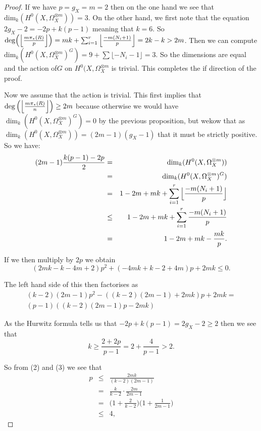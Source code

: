 \documentclass[11pt]{article} %
\begin{document}
\begin{proof}
If we have $p=g_X=m=2$ then on the one hand we see that $\mbox{dim}_k(H^0(X,\Omega_X^{\otimes m}))=3$. On the other hand, we first note that the equation $2g_X-2=-2p+k(p-1)$ meaning that $k=6$. So $\mbox{deg}\Big(\Big{\lfloor}{\frac{m\pi_*(R)}{p}}\Big{\rfloor}\Big)=mk+\sum_{i=1}^r\Big{\lfloor}{\frac{-m(N_i+1)}{p}}\Big{\rfloor}=2k-k>2m$. Then we can compute $\mbox{dim}_k(H^0(X,\Omega_X^{\otimes m})^G)=9+\sum\lfloor-N_i-1\rfloor=3$. So the dimensions are equal and the action of$G$ on $H^0(X,\Omega_X^{\otimes m}$ is trivial. This completes the if direction of the proof.

Now we assume that the action is trivial. This first implies that $\deg\Big(\Big{\lfloor}\frac{m\pi_*(R)}{n}\Big{\rfloor}\Big)\geq 2m$ because otherwise we would have $\dim_k(H^0(X,\Omega_X^{\otimes m})^G)=0$ by the previous proposition, but wekow that as $\dim_k(H^0(X,\Omega_X^{\otimes m}))=(2m-1)(g_X-1)$ that it must be strictly positive. So we have:
	\begin{eqnarray}
		(2m-1)\frac{k(p-1)-2p}{2} & = & \dim_k(H^0(X,\Omega_X^{\otimes m})) \nonumber\\
		& = & \dim_k(H^0(X,\Omega_X^{\otimes m})^G) \nonumber\\
		& = & 1-2m+mk+\sum_{i=1}^r\Big{\lfloor}\frac{-m(N_i+1)}{p}\Big{\rfloor}\nonumber \\
		& \leq & 1-2m+mk+\sum_{i=1}^r\frac{-m(N_i+1)}{p}\nonumber \\
		& = & 1-2m+mk-\frac{mk}{p}.
	\end{eqnarray}

If we then multiply by $2p$ we obtain
	\begin{equation}
		(2mk-k-4m+2)p^2+(-4mk+k-2+4m)p+2mk\leq 0.
	\end{equation}

The left hand side of this then factorises as
	\begin{multline*}
		(k-2)(2m-1)p^2-((k-2)(2m-1)+2mk)p+2mk = \\
		(p-1)((k-2)(2m-1)p-2mk)
	\end{multline*}

As the Hurwitz formula tells us that $-2p+k(p-1)=2g_X-2 \geq 2$ then we see that 
	\begin{equation}
		k\geq \frac{2+2p}{p-1}=2+\frac{4}{p-1}>2.
	\end{equation}

So from (2) and (3) we see that
	\begin{eqnarray}
		p & \leq & \frac{2mk}{(k-2)(2m-1)}\nonumber\\
		& = & \frac{k}{k-2}\cdot\frac{2m}{2m-1}\nonumber\\
		& = & \Big( 1+\frac{2}{k-2} \Big) \Big(1+\frac{1}{2m-1} \Big)\\
		& \leq & 4, \nonumber
	\end{eqnarray}


\end{proof}
\end{document}
